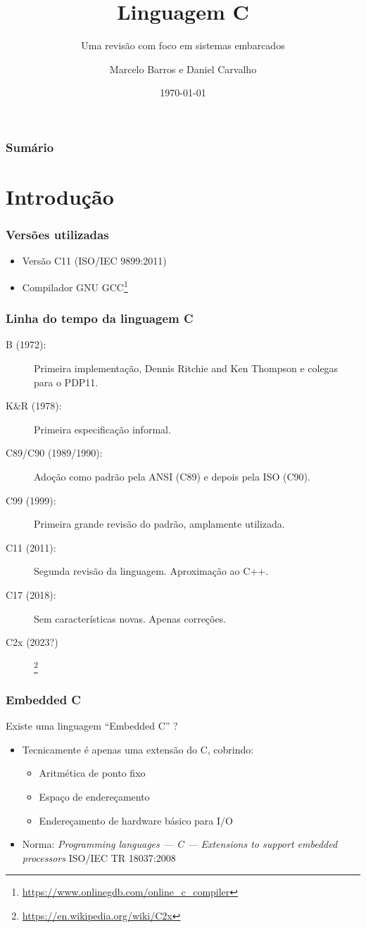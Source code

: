\documentclass{beamer}
\title{Linguagem C}
\subtitle{Uma revisão com foco em sistemas embarcados}
\author{Marcelo Barros e Daniel Carvalho}
\institute{UFU/FEELT}
\date{\today}
\begin{document}
\begin{frame}
\titlepage
\end{frame}

\begin{frame}
\frametitle{Sumário}
\tableofcontents
\end{frame}

\section{Introdução}
	
\begin{frame}
	\frametitle{Versões utilizadas}
	\begin{itemize}
		\item Versão C11 (ISO/IEC 9899:2011)
		\item Compilador GNU GCC\footnote{\url{https://www.onlinegdb.com/online_c_compiler}}
	\end{itemize}
\end{frame}

\begin{frame}
	\frametitle{Linha do tempo da linguagem C}
	\begin{description}
		\item[ B (1972):] Primeira implementação, Dennis Ritchie and Ken Thompson e colegas para o PDP11.
		\item [K\&R (1978):] Primeira especificação informal.
		\item [C89/C90 (1989/1990):] Adoção como padrão pela ANSI (C89) e depois pela ISO (C90).
		\item [C99 (1999):] Primeira grande revisão do padrão, amplamente utilizada.
		\item [C11 (2011):] Segunda revisão da linguagem. Aproximação ao C++. 
		\item [C17 (2018):] Sem características novas. Apenas correções.
		\item [C2x (2023?)]\footnote{\url{https://en.wikipedia.org/wiki/C2x}}
	\end{description}
\end{frame}

\begin{frame}
	\frametitle{Embedded C}
	{Existe uma linguagem ``Embedded C'' ?}
	\vspace*{0.5cm}
	\begin{itemize}
		\item Tecnicamente é apenas uma extensão do C, cobrindo:
	\begin{itemize}
		\item Aritmética de ponto fixo
		\item Espaço de endereçamento
		\item Endereçamento de hardware básico para I/O
	\end{itemize}
		\item Norma: \textit{Programming languages — C — Extensions to support embedded processors}
		ISO/IEC TR 18037:2008
	\end{itemize}
\end{frame}
\end{document}
